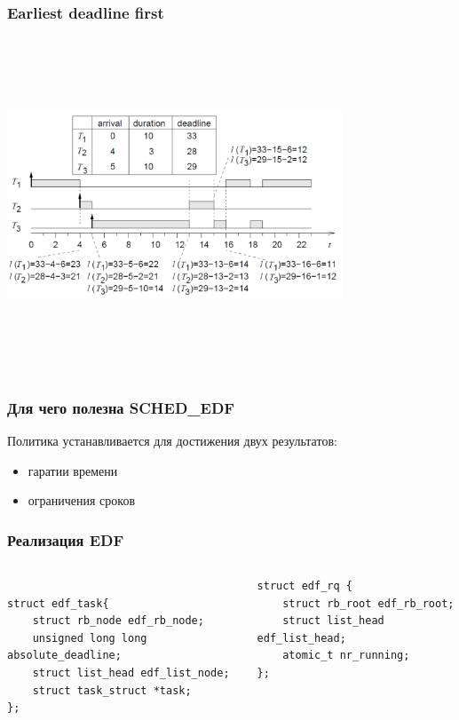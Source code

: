 \documentclass[10pt]{beamer}
\begin{document}
\begin{frame}\frametitle{Earliest deadline first}
\center
\includegraphics[width=10cm, height=10cm,keepaspectratio]{sched6}
\end{frame}

\begin{frame}\frametitle{Для чего полезна SCHED\_EDF}
Политика устанавливается для достижения двух результатов:
\begin{itemize}
\item гаратии времени
\item ограничения сроков
\end{itemize}
\end{frame}


\begin{frame}[fragile]\frametitle{Реализация EDF}
\center
	\begin{columns}
		\begin{lstlisting}[style=crs_cpp]
		
struct edf_task{
	struct rb_node edf_rb_node;
	unsigned long long absolute_deadline;
	struct list_head edf_list_node;
	struct task_struct *task;
};
 		\end{lstlisting}
 		
		\begin{lstlisting}[style = crs_llvm]
struct edf_rq {
	struct rb_root edf_rb_root;
	struct list_head edf_list_head;
	atomic_t nr_running;
};
 		\end{lstlisting}
 	\end{columns}
\colorbox{white}{\parbox{0.9\textwidth}{{\begin{center}  \end{center} }}}\\

\end{frame}
\end{document}
